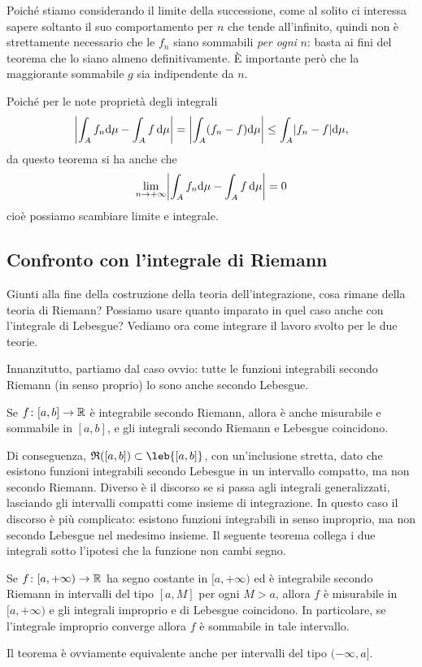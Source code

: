 Poich\'e stiamo considerando il limite della successione, come al solito ci interessa sapere soltanto il suo comportamento per $n$ che tende all'infinito, quindi non è strettamente necessario che le $f_n$ siano sommabili \emph{per ogni} $n$: basta ai fini del teorema che lo siano almeno definitivamente.
È importante però che la maggiorante sommabile $g$ sia indipendente da $n$.
\begin{osservazione} \label{o:convergenza-dominata}
	Poich\'e per le note proprietà degli integrali
	\begin{equation*}
		\abs[\bigg]{\int_Af_n\dd\mu-\int_Af\,\dd\mu}=\abs[\bigg]{\int_A(f_n-f)\dd\mu}\leq\int_A\abs{f_n-f}\dd\mu,
	\end{equation*}
	da questo teorema si ha anche che
	\begin{equation}
		\lim_{n\to+\infty}\abs[\bigg]{\int_Af_n\dd\mu-\int_Af\,\dd\mu}=0
	\end{equation}
	cioè possiamo scambiare limite e integrale.
\end{osservazione}

\subsection*{Confronto con l'integrale di Riemann}
Giunti alla fine della costruzione della teoria dell'integrazione, cosa rimane della teoria di Riemann?
Possiamo usare quanto imparato in quel caso anche con l'integrale di Lebesgue?
Vediamo ora come integrare il lavoro svolto per le due teorie. %

Innanzitutto, partiamo dal caso ovvio: tutte le funzioni integrabili secondo Riemann (in senso proprio) lo sono anche secondo Lebesgue.
\begin{teorema} \label{t:integrale-riemann-lebesgue}
	Se $f\colon[a,b]\to\R$ è integrabile secondo Riemann, allora è anche misurabile e sommabile in $[a,b]$, e gli integrali secondo Riemann e Lebesgue coincidono.
\end{teorema}
Di conseguenza, $\rie{[a,b]}\subset\leb{[a,b]}$, con un'inclusione stretta, dato che esistono funzioni integrabili secondo Lebesgue in un intervallo compatto, ma non secondo Riemann.
Diverso è il discorso se si passa agli integrali generalizzati, lasciando gli intervalli compatti come insieme di integrazione.
In questo caso il discorso è più complicato: esistono funzioni integrabili in senso improprio, ma non secondo Lebesgue nel medesimo insieme.
Il seguente teorema collega i due integrali sotto l'ipotesi che la funzione non cambi segno.
\begin{teorema} \label{t:integrale-improprio-lebesgue}
	Se $f\colon[a,+\infty)\to\R$ ha segno costante in $[a,+\infty)$ ed è integrabile secondo Riemann in intervalli del tipo $[a,M]$ per ogni $M>a$, allora $f$ è misurabile in $[a,+\infty)$ e gli integrali improprio e di Lebesgue coincidono.
	In particolare, se l'integrale improprio converge allora $f$ è sommabile in tale intervallo.
\end{teorema}
Il teorema è ovviamente equivalente anche per intervalli del tipo $(-\infty,a]$.

